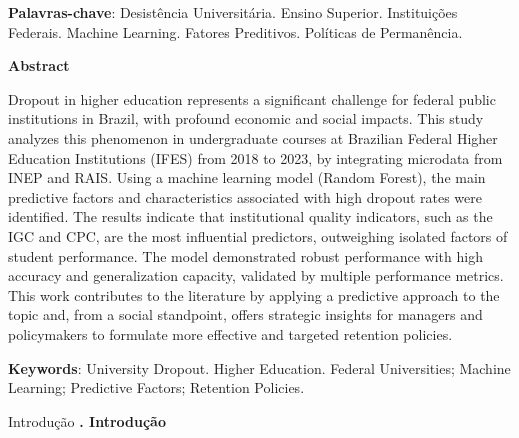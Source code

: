 \vspace{1em}

\noindent
\textbf{Palavras-chave}: Desistência Universitária. Ensino Superior. Instituições Federais. Machine Learning. Fatores Preditivos. Políticas de Permanência.

\vspace{3em} %

\noindent
\textbf{Abstract}

\vspace{1em}

\noindent
Dropout in higher education represents a significant challenge for federal public institutions in Brazil, with profound economic and social impacts. This study analyzes this phenomenon in undergraduate courses at Brazilian Federal Higher Education Institutions (IFES) from 2018 to 2023, by integrating microdata from INEP and RAIS. Using a machine learning model (Random Forest), the main predictive factors and characteristics associated with high dropout rates were identified. The results indicate that institutional quality indicators, such as the IGC and CPC, are the most influential predictors, outweighing isolated factors of student performance. The model demonstrated robust performance with high accuracy and generalization capacity, validated by multiple performance metrics. This work contributes to the literature by applying a predictive approach to the topic and, from a social standpoint, offers strategic insights for managers and policymakers to formulate more effective and targeted retention policies.

\vspace{1em}

\noindent
\textbf{Keywords}: University Dropout. Higher Education. Federal Universities; Machine Learning; Predictive Factors; Retention Policies.



\textual
{}
\clearpage %

\pagestyle{somenteNumero}
\cleardoublepage


{\protect\numberline{\themanualchapter}Introdução}
\vspace{2em}
\noindent\textbf{\themanualchapter. Introdução}
\vspace{1em}
\par

